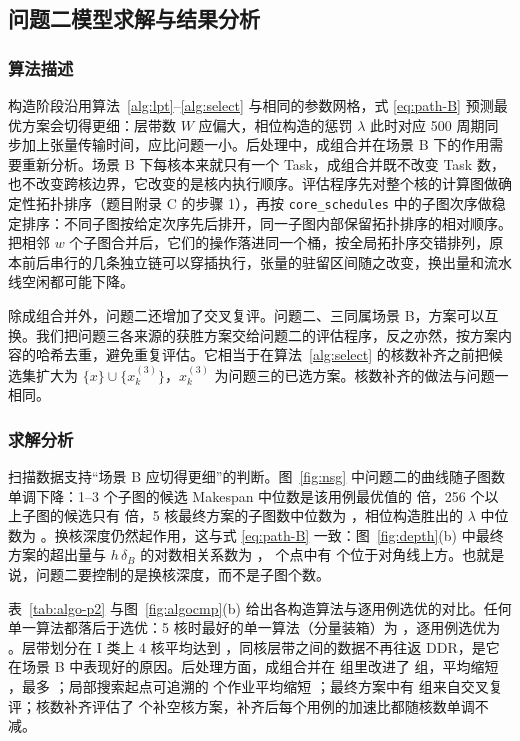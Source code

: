 \subsection{问题二模型求解与结果分析}

\subsubsection{算法描述}

构造阶段沿用算法~\ref{alg:lpt}--\ref{alg:select} 与相同的参数网格，式 \eqref{eq:path-B} 预测最优方案会切得更细：层带数 $W$ 应偏大，相位构造的惩罚 $\lambda$ 此时对应 500 周期同步加上张量传输时间，应比问题一小。\label{sec:p2-coarsen}后处理中，成组合并在场景 B 下的作用需要重新分析。场景 B 下每核本来就只有一个 Task，成组合并既不改变 Task 数，也不改变跨核边界，它改变的是核内执行顺序。评估程序先对整个核的计算图做确定性拓扑排序（题目附录 C 的步骤 1），再按 \texttt{core\_schedules} 中的子图次序做稳定排序：不同子图按给定次序先后排开，同一子图内部保留拓扑排序的相对顺序。把相邻 $w$ 个子图合并后，它们的操作落进同一个桶，按全局拓扑序交错排列，原本前后串行的几条独立链可以穿插执行，张量的驻留区间随之改变，换出量和流水线空闲都可能下降。

除成组合并外，问题二还增加了交叉复评。问题二、三同属场景 B，方案可以互换。我们把问题三各来源的获胜方案交给问题二的评估程序，反之亦然，按方案内容的哈希去重，避免重复评估。它相当于在算法~\ref{alg:select} 的核数补齐之前把候选集扩大为 $\{x\}\cup\{x^{(3)}_{k}\}$，$x^{(3)}_{k}$ 为问题三的已选方案。核数补齐的做法与问题一相同。

\subsubsection{求解分析}

扫描数据支持“场景 B 应切得更细”的判断。图~\ref{fig:nsg} 中问题二的曲线随子图数单调下降：1--3 个子图的候选 Makespan 中位数是该用例最优值的  倍，256 个以上子图的候选只有  倍，5 核最终方案的子图数中位数为 ，相位构造胜出的 $\lambda$ 中位数为 。换核深度仍然起作用，这与式 \eqref{eq:path-B} 一致：图~\ref{fig:depth}(b) 中最终方案的超出量与 $h\,\delta_B$ 的对数相关系数为 ， 个点中有  个位于对角线上方。也就是说，问题二要控制的是换核深度，而不是子图个数。

表~\ref{tab:algo-p2} 与图~\ref{fig:algocmp}(b) 给出各构造算法与逐用例选优的对比。任何单一算法都落后于选优：5 核时最好的单一算法（分量装箱）为 ，逐用例选优为 。层带划分在 I 类上 4 核平均达到 ，同核层带之间的数据不再往返 DDR，是它在场景 B 中表现好的原因。后处理方面，成组合并在  组里改进了  组，平均缩短 ，最多 ；局部搜索起点可追溯的  个作业平均缩短 ；最终方案中有  组来自交叉复评；核数补齐评估了  个补空核方案，补齐后每个用例的加速比都随核数单调不减。


